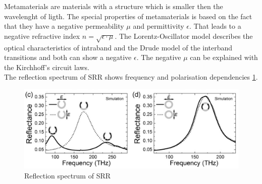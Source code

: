 Metamaterials are materials with a structure which is smaller then the wavelenght of ligth. The special properties of metamaterials is  based on the fact that they have a negative permeability $\mu$ and permittivity $\epsilon$. That leads to a negative refractive index $n = \sqrt{\epsilon \cdot \mu}$. 
The Lorentz-Oscillator model describes the optical characteristics of intraband  and the Drude model of the interband transitions and both can show  a negative $\epsilon$. The negative $\mu$ can be explained with the Kirchhoff's circuit laws. \\
The reflection spectrum of SRR shows frequency and polarisation dependencies \ref{spectrum_theory}.





\begin{figure}[H]
\centering
\includegraphics[scale=1]{../figures/spectrum_theory.png}
\caption{Reflection spectrum of SRR \cite{paper_Giessen_meta}  }
    \label{spectrum_theory}
\end{figure}
